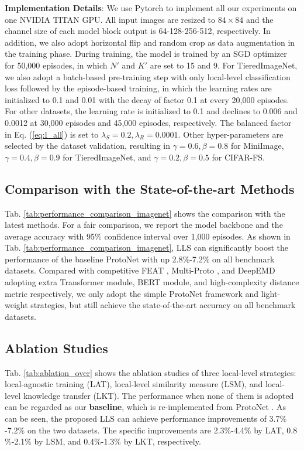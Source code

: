 \documentclass{article}
\begin{document}
\noindent\textbf{Implementation Details}: 
We use Pytorch to implement all our experiments on one NVIDIA TITAN GPU. All input images are resized to $84 \times 84$ and the channel size of each model block output is 64-128-256-512, respectively. In addition, we also adopt horizontal flip and random crop as data augmentation in the training phase. During training, the model is trained by an SGD optimizer for 50,000 episodes, in which $N'$ and $K'$ are set to 15 and 9. For TieredImageNet, we also adopt a batch-based pre-training step with only local-level classification loss followed by the episode-based training, in which the learning rates are initialized to 0.1 and 0.01 with the decay of factor 0.1 at every 20,000 episodes.  For other datasets, the learning rate is initialized to 0.1 and declines to 0.006 and 0.0012 at 30,000 episodes and 45,000 episodes, respectively. The balanced factor in Eq. (\ref{eq:l_all}) is set to $\lambda_S = 0.2, \lambda_R = 0.0001 $. Other hyper-parameters are selected by the dataset validation, resulting in $\gamma=0.6, \beta=0.8$ for MiniImage, $\gamma=0.4, \beta=0.9$ for TieredImageNet, and $\gamma=0.2, \beta=0.5$ for CIFAR-FS.


\subsection{Comparison with the State-of-the-art Methods}
\label{sec:SOTA}
Tab. \ref{tab:performance_comparison_imagenet} shows the comparison with the latest methods. For a fair comparison, we report the model backbone and the average accuracy with 95$\%$ confidence interval over 1,000 episodes. As shown in Tab. \ref{tab:performance_comparison_imagenet}, LLS can significantly boost the performance of the baseline ProtoNet with up 2.8${\%}$-7.2${\%}$ on all benchmark datasets. Compared with competitive FEAT \cite{ye2020set}, Multi-Proto \cite{multi-pro}, and DeepEMD \cite{zhang2020deepemd} adopting extra Transformer module, BERT module, and high-complexity distance metric respectively, we only adopt the simple ProtoNet framework and light-weight strategies, but still achieve the state-of-the-art accuracy on all benchmark datasets. 



\subsection{Ablation Studies}
\label{sec:ablation}
Tab. \ref{tab:ablation_over} shows the ablation studies of three local-level strategies: local-agnostic training (LAT), local-level similarity measure (LSM), and local-level knowledge transfer (LKT). The performance when none of them is adopted can be regarded as our \textbf{baseline}, which is re-implemented from ProtoNet \cite{snell2017prototypical}. As can be seen, the proposed LLS can achieve performance improvements of 3.7${\%}$-7.2${\%}$ on the two datasets. The specific improvements are 2.3${\%}$-4.4${\%}$ by LAT, 0.8${\%}$-2.1${\%}$ by LSM, and 0.4${\%}$-1.3${\%}$ by LKT, respectively.
\end{document}
